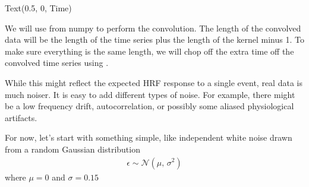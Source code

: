 \documentclass[letterpaper,10pt,english]{sphinxmanual}
\begin{document}
\begin{sphinxVerbatim}[commandchars=\\\{\}]
Text(0.5, 0, \PYGZsq{}Time\PYGZsq{})
\end{sphinxVerbatim}

\noindent{}

We will use  from numpy to perform the convolution.  The length of the convolved data will be the length of the time series plus the length of the kernel minus 1. To make sure everything is the same length, we will chop off the extra time off the convolved time series using .

\begin{sphinxVerbatim}[commandchars=\\\{\}]
    
    
  \PYG{p}{[} \PYG{p}{]}

 \PYG{p}{[} \PYG{p}{]}
\end{sphinxVerbatim}

\noindent{}

While this might reflect the expected HRF response to a single event, real data is much noiser. It is easy to add different types of noise. For example, there might be a low frequency drift, autocorrelation, or possibly some aliased physiological artifacts.

For now, let’s start with something simple, like independent white noise drawn from a random Gaussian distribution
\begin{equation*}
\begin{split}\epsilon \sim \mathcal{N}(\mu,\,\sigma^{2})\end{split}
\end{equation*}
where \(\mu = 0\) and \(\sigma = 0.15\)
\end{document}
